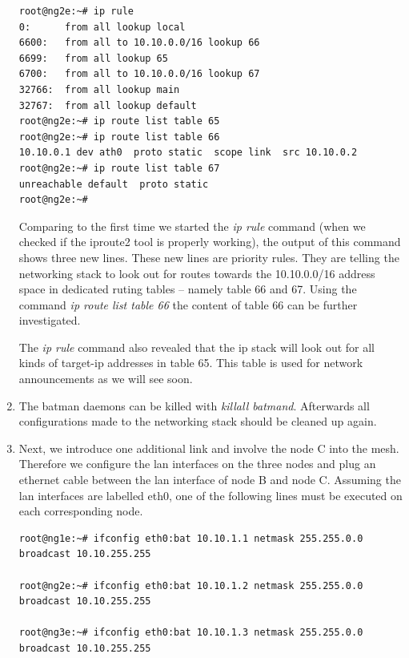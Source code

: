 \documentclass[11pt]{article}
\begin{document}
\begin{enumerate}
\begin{small} \begin{verbatim}
root@ng2e:~# ip rule
0:      from all lookup local
6600:   from all to 10.10.0.0/16 lookup 66
6699:   from all lookup 65
6700:   from all to 10.10.0.0/16 lookup 67
32766:  from all lookup main
32767:  from all lookup default
root@ng2e:~# ip route list table 65
root@ng2e:~# ip route list table 66
10.10.0.1 dev ath0  proto static  scope link  src 10.10.0.2
root@ng2e:~# ip route list table 67
unreachable default  proto static
root@ng2e:~#
\end{verbatim} \end{small}

Comparing to the first time we started the \emph{ip rule} command (when we checked if the iproute2 tool is properly working), the output of this command shows three new lines. 
These new lines are priority rules. 
They are telling the networking stack to look out for routes towards the 10.10.0.0/16 address space in dedicated ruting tables -- namely table 66 and 67. 
Using the command \emph{ip route list table 66} the content of table 66 can be further investigated. 

The \emph{ip rule} command also revealed that the ip stack will look out for all kinds of target-ip addresses in table 65. This table is used for network announcements as we will see soon.

\item The batman daemons can be killed with \emph{killall batmand}. Afterwards all configurations made to the networking stack should be cleaned up again.

\item Next, we introduce one additional link and involve the node C into the mesh. 
Therefore we configure the lan interfaces on the three nodes and plug an ethernet cable between the lan interface of node B and node C. 
Assuming the lan interfaces are labelled eth0, one of the following lines must be executed on each corresponding node.

\begin{small} \begin{verbatim}
root@ng1e:~# ifconfig eth0:bat 10.10.1.1 netmask 255.255.0.0 broadcast 10.10.255.255

root@ng2e:~# ifconfig eth0:bat 10.10.1.2 netmask 255.255.0.0 broadcast 10.10.255.255

root@ng3e:~# ifconfig eth0:bat 10.10.1.3 netmask 255.255.0.0 broadcast 10.10.255.255
\end{verbatim} \end{small}


\end{enumerate}
\end{document}
